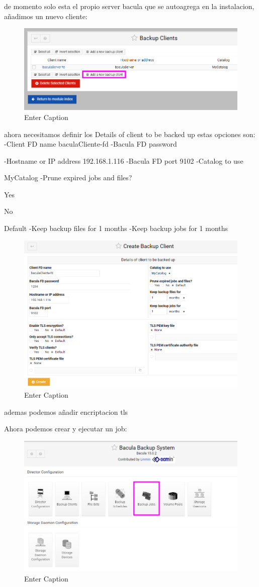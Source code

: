 de momento solo esta el propio server bacula que se autoagrega en la instalacion, añadimos un nuevo cliente:

\begin{figure}[H]
    \centering
    \includegraphics[width=0.5\linewidth]{instalacionBacula/addnewbuckupclient.png}
    \caption{Enter Caption}
\end{figure}


ahora necesitamos definir los Details of client to be backed up
estas opciones son:
-Client FD name
baculaCliente-fd
-Bacula FD password

-Hostname or IP address
192.168.1.116
-Bacula FD port
9102
-Catalog to use

MyCatalog
-Prune expired jobs and files?

  Yes 
 
  No 
 
  Default 
-Keep backup files for
1 months
-Keep backup jobs for
1 months


\begin{figure}[H]
    \centering
    \includegraphics[width=0.5\linewidth]{instalacionBacula/detalesclienteparabuckup.png}
    \caption{Enter Caption}
\end{figure}

ademas podemos añadir encriptacion tls


Ahora podemos crear y ejecutar un job:

\begin{figure}[H]
    \centering
    \includegraphics[width=0.5\linewidth]{instalacionBacula/createJOB.png}
    \caption{Enter Caption}
\end{figure}

